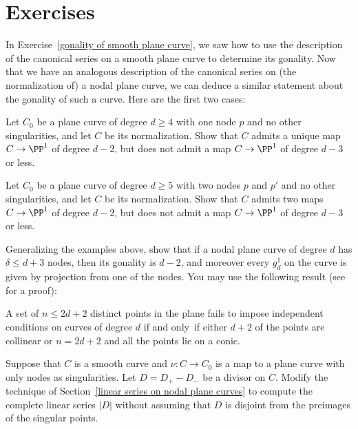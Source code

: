 \section{Exercises}

In Exercise~\ref{gonality of smooth plane curve}, we saw how to use the
%
description of the canonical series on a smooth plane curve to determine its
gonality.
Now that we have an analogous description of the canonical
series on (the normalization of) a nodal plane curve, we can deduce a
similar statement about the gonality of such a curve. Here are the first
two cases:

\begin{exercise}
Let $C_0$ be a plane curve of degree $d\geq 4$ with one node $p$ and no
other singularities, and let $C$ be its normalization. Show that $C$
admits a unique map $C \to \PP^1$ of degree $d-2$, but does not admit
%
a map $C \to \PP^1$ of degree $d-3$ or less.
\end{exercise}

\begin{exercise}
Let $C_0$ be a plane curve of degree $d\geq 5$ with two nodes $p$ and $p'$
and no other singularities, and let $C$ be its normalization. Show that
%
$C$ admits two maps $C \to \PP^1$ of degree $d-2$, but does not admit
a map $C \to \PP^1$ of degree $d-3$ or less.
\end{exercise}

\begin{exercise}
Generalizing the examples above, show that if a nodal plane curve of
degree $d$ has $\delta\leq d+3$ nodes,
then its gonality is $d-2$, and moreover every
$g^1_d$
%
on the curve is
given by projection from one of the nodes.
You may use the following result
(see \cite[p.~302]{MR1376653} for a proof):

\begin{unproposition}\label{independent conditions}
 A set of $n \leq 2d+ 2$ distinct
points in the plane fails to impose independent conditions on curves
of degree
$d$ if and only~if either $d + 2$ of the points  are collinear or $n =
2d + 2$ and all the points lie
on a conic.
\end{unproposition}
\end{exercise}

\begin{exercise}\label{general case of divisors on nodal curves}
Suppose that $C$ is a smooth curve and $\nu: C \to C_0$ is a map to a
plane curve with
only nodes as singularities. Let $D = D_{+}-D_{-}$ be a divisor on
$C$. Modify the
technique of Section~\ref{linear series on nodal plane curves} to compute
the
complete linear series
$|D|$ without assuming that $D$ is disjoint from the
%
preimages of the singular
%
points.
\end{exercise}

